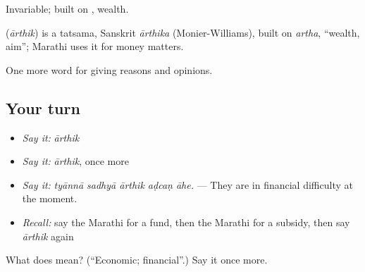 Invariable; built on , wealth.

\begin{cousinweb}
\textbf{} (\emph{ārthik}) is a tatsama, Sanskrit \emph{ārthika} (Monier-Williams), built on \emph{artha}, \textquotedblleft{}wealth, aim\textquotedblright{}; Marathi uses it for money matters.
\end{cousinweb}

\begin{grammarlens}[title={What you've built}]
One more word for giving reasons and opinions.
\end{grammarlens}

\subsection*{Your turn}
\begin{itemize}
\raggedright
  \item \emph{Say it:} \emph{ārthik}
  \item \emph{Say it:} \emph{ārthik}, once more
  \item \emph{Say it:} \emph{tyānnā sadhyā ārthik aḍcaṇ āhe.} — They are in financial difficulty at the moment.
  \item \emph{Recall:} say the Marathi for a fund, then the Marathi for a subsidy, then say \emph{ārthik} again
\end{itemize}

\begin{tcolorbox}[breakable,colback=teal!4,colframe=teal!35!black,title={Before you move on}]
What does  mean? (\textquotedblleft{}Economic; financial\textquotedblright{}.) Say it once more.
\end{tcolorbox}
